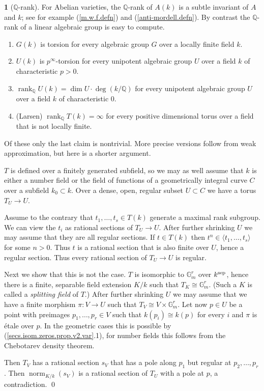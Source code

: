 \documentclass{amsart}
\theoremstyle{definition}
\newtheorem{say}[thm]{}
\theoremstyle{remark}
\newcommand{\q}[0]{{\mathbb Q}}
\newcommand{\rank}[0]{\operatorname{rank}}
\newcommand{\gm}[0]{{\mathbb G}_m}
\newcommand{\norm}[0]{\operatorname{norm}}
\begin{document}
\begin{say}[$\q$-rank]\label{Q.rank.say} For Abelian varieties, the $\q$-rank of $A(k)$ is a subtle invariant of $A$ and $k$; see for example
(\ref{m.w.f.defn}) and (\ref{anti-mordell.defn}). By contrast the $\q$-rank of a linear algebraic group is easy to compute.
\begin{enumerate}
\item   $G(k)$ is torsion for every algebraic group $G$ over a locally finite field $k$.
\item  $U(k)$ is $p^{\infty}$-torsion for every  unipotent algebraic group $U$ over a  field $k$ of characteristic $p>0$.
\item  $\rank_{\q}U(k)=\dim U\cdot \deg(k/\q)$ for every unipotent algebraic group $U$ over a  field $k$ of characteristic $0$.
\item  (Larsen) $\rank_{\q}T(k)=\infty$ for every  positive dimensional  torus over a field that is not locally finite.
\end{enumerate}
Of these only the last claim is nontrivial. More precise versions follow from   weak approximation, but here is a 
shorter argument. 

$T$ is defined over a finitely generated subfield, so we may as well assume that $k$ is either a number field or the field of functions  of a geometrically integral 
curve $C$ over a subfield $k_0\subset k$. 
  Over a dense, open, regular  subset
$U\subset C$ we have a torus $T_U\to U$. 

Assume to the contrary that $t_1,\dots, t_s\in T(k)$ generate a maximal rank subgroup.  We can view the $t_i$ as rational sections of $T_U\to U$. After further shrinking $U$ we may assume that they are all regular sections. 
If $t\in T(k)$ then $t^n\in \langle t_1,\dots, t_s\rangle$ for some $n>0$. Thus $t$ is a rational section that is also finite over $U$, hence a regular section. 
Thus every rational section of $T_U\to U$ is regular. 

Next we show that this is not the case. 
$T$ is isomorphic to   $\gm^r$ over $ k^{\rm sep}$, hence there is a 
finite, separable field extension  $K/k$   such that
$T_K\cong  \gm^r$. (Such a $K$ is called a {\it  splitting field} of $T$.)
After further shrinking $U$ we may assume that we have a finite morphism
$\pi:V\to U$ such that $T_V\cong V\times \gm^r$. 
Let now $p\in U$ be a point with preimages $p_1,\dots, p_r\in V$
such that $k(p_i)\cong k(p)$ for every $i$ and $\pi$ is \'etale over $p$.
In the geometric cases this is possible  by (\ref{secs.isom.zeros.prop.v2.var}.1),
 for number fields this follows from the  Chebotarev density theorem.
 
Then $T_V$ has a rational section $s_V$ that has a pole along $p_1$ but regular at $p_2,\dots, p_r$.  Then
$\norm_{K/k}(s_V)$ is a rational section of $T_U$ with a pole at $p$, a contradiction.  \qed

\end{say}
\end{document}
